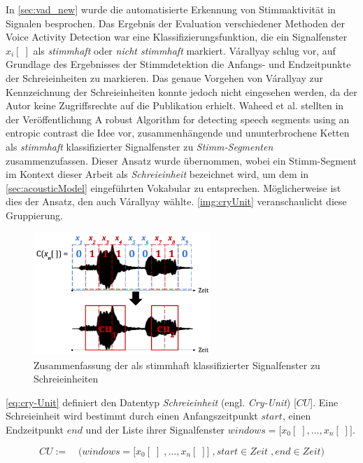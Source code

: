 In \autoref{sec:vad_new} wurde die automatisierte Erkennung von Stimmaktivität in Signalen besprochen. Das Ergebnis der Evaluation verschiedener Methoden der Voice Activity Detection war eine Klassifizierungsfunktion, die ein Signalfenster $x_i[\;]$ als \emph{stimmhaft} oder \emph{nicht stimmhaft} markiert. Várallyay \cite[S. 16 - 17]{cry_thesis} schlug vor, auf Grundlage des Ergebnisses der Stimmdetektion die Anfangs- und Endzeitpunkte der Schreieinheiten zu markieren. Das genaue Vorgehen von Várallyay zur Kennzeichnung der Schreieinheiten konnte jedoch nicht eingesehen werden, da der Autor keine Zugriffsrechte auf die Publikation erhielt.
Waheed et al. \cite{vad_entropy} stellten in der Veröffentlichung \glqq A robust Algorithm for detecting speech segments using an entropic contrast\grqq{} die Idee vor, zusammenhängende und ununterbrochene Ketten als \emph{stimmhaft} klassifizierter Signalfenster zu \emph{Stimm-Segmenten} zusammenzufassen. Dieser Ansatz wurde übernommen, wobei ein Stimm-Segment im Kontext dieser Arbeit als \emph{Schreieinheit} bezeichnet wird, um dem in \autoref{sec:acousticModel} eingeführten Vokabular zu entsprechen. Möglicherweise ist dies der Ansatz, den auch  Várallyay wählte. \autoref{img:cryUnit} veranschaulicht diese Gruppierung. 

\begin{figure}[h]
	\centering
	\includegraphics[width=0.6\textwidth]{bilder/cry-Unit02.png}
	\caption{Zusammenfassung der als stimmhaft klassifizierter Signalfenster zu Schreieinheiten}
	\label{img:cryUnit}
\end{figure}

\autoref{eq:cry-Unit} definiert den Datentyp \emph{Schreieinheit} (engl. \emph{Cry-Unit}) [$CU$]. Eine Schreieinheit wird bestimmt durch einen Anfangszeitpunkt $start$, einen Endzeitpunkt $end$ und der Liste ihrer Signalfenster $windows = \big[x_0[\;], \ldots, x_n[\;]\big]$.

\begin{equation}
CU := \quad \Big(windows = \big[x_0[\;] \; ,\ldots, x_n[\;] \big] \;, start \in Zeit \;, end \in Zeit \Big)
\label{eq:cry-Unit}
\end{equation}

